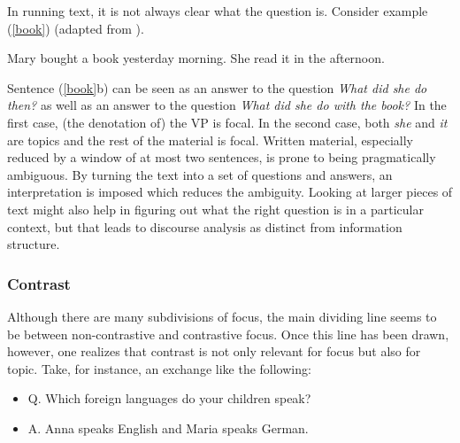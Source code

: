 \documentclass[output=paper,hidelinks]{langscibook}
\begin{document}
In running text, it is not always clear what the question is. Consider example (\ref{book}) (adapted from \citealt{VallduviEngdahl}).
 
\ea\label{book}
\ea Mary bought a book yesterday morning.
\ex She read it in the afternoon.
\z\z
 
Sentence (\ref{book}b) can be seen as an answer to the question \textit{What did she do then?} as well as an answer to the question \textit{What did she do with the book?}  In the first case, (the denotation of) the VP is focal. In the second case, both \textit{she} and \textit{it} are topics and the rest of the material is focal. Written material, especially reduced by a window of at most two sentences, is prone to being pragmatically ambiguous. By turning the text into a set of questions and answers, an interpretation is imposed which reduces the ambiguity. Looking at larger pieces of text might also help in figuring out what the right question is in a particular context, but that leads to discourse analysis as distinct from information structure. 



\subsubsection{Contrast} \label{contrast}
Although there are many subdivisions of focus, the main dividing line seems to be between non-contrastive and contrastive focus. Once this line has been drawn, however, one realizes that contrast is not only relevant for focus but also for topic. Take, for instance, an exchange like the following: 

\ea\label{languages}\begin{itemize} 
\setlength\itemsep{-1pt}
    \item Q. Which foreign languages do your children speak?
    \item A. Anna speaks English and Maria speaks German.
\end{itemize}
\z
\end{document}
